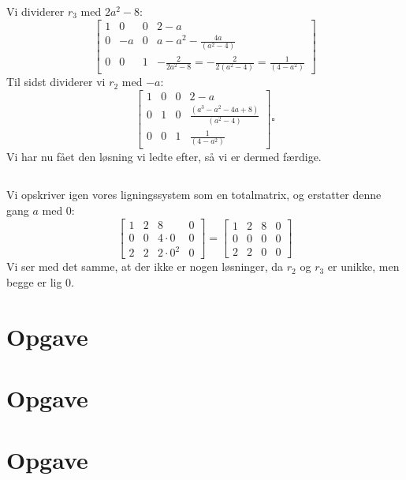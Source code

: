 \documentclass[a4paper,12pt]{article}
\begin{document}
Vi dividerer $r_3$ med $2a^2-8$:
\[
\left[\begin{array}{ccc|c}
    1 & 0 & 0 & 2-a \\
    0 & -a & 0 & a - a^2 -\frac{4a}{(a^2 - 4)} \\
    0 & 0 & 1 & -\frac{2}{2a^2-8} = -\frac{2}{2(a^2-4)} = \frac{1}{(4-a^2)}
\end{array}\right]
\]
Til sidst dividerer vi $r_2$ med $-a$:
\[
\left[\begin{array}{ccc|c}
    1 & 0 & 0 & 2-a \\
    0 & 1 & 0 & \frac{(a^3 - a^2 - 4a + 8)}{(a^2 - 4)} \\
    0 & 0 & 1 & \frac{1}{(4-a^2)}
\end{array}\right]
\square
\]
Vi har nu fået den løsning vi ledte efter, så vi er dermed færdige.

\subsection{}
Vi opskriver igen vores ligningssystem som en totalmatrix, og erstatter denne gang $a$ med 0:
\[
\left[\begin{array}{ccc|c}
    1 & 2 & 8 & 0 \\
    0 & 0 & 4\cdot0 & 0 \\
    2 & 2 & 2\cdot0^2 & 0
\end{array}\right]
=
\left[\begin{array}{ccc|c}
    1 & 2 & 8 & 0 \\
    0 & 0 & 0 & 0 \\
    2 & 2 & 0 & 0
\end{array}\right]
\]
Vi ser med det samme, at der ikke er nogen løsninger, da $r_2$ og $r_3$ er unikke, men begge er lig $0$.

\section[Opgave]{Opgave}

\section[Opgave]{Opgave}

\section[Opgave]{Opgave}
\end{document}
